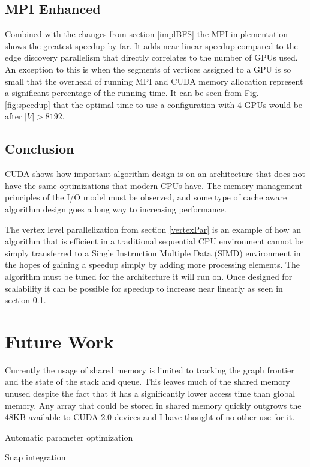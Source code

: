 \documentclass[10pt,twocolumn]{article}
\begin{document}
\subsection{MPI Enhanced}
\label{mpiResults}
Combined with the changes from section \ref{implBFS} the MPI implementation shows the greatest speedup by far. It adds near linear speedup compared to the edge discovery parallelism that directly correlates to the number of GPUs used. An exception to this is when the segments of vertices assigned to a GPU is so small that the overhead of running MPI and CUDA memory allocation represent a significant percentage of the running time. It can be seen from Fig. \ref{fig:speedup} that the optimal time to use a configuration with 4 GPUs would be after $|V| > 8192$.

\subsection{Conclusion}
CUDA shows how important algorithm design is on an architecture that does not have the same optimizations that modern CPUs have. The memory management principles of the I/O model must be observed, and some type of cache aware algorithm design goes a long way to increasing performance.

The vertex level parallelization from section \ref{vertexPar} is an example of how an algorithm that is efficient in a traditional sequential CPU environment cannot be simply transferred to a Single Instruction Multiple Data (SIMD) environment in the hopes of gaining a speedup simply by adding more processing elements. The algorithm must be tuned for the architecture it will run on. Once designed for scalability it can be possible for speedup to increase near linearly as seen in section \ref{mpiResults}.

\section{Future Work}
Currently the usage of shared memory is limited to tracking the graph frontier and the state of the stack and queue. This leaves much of the shared memory unused despite the fact that it has a significantly lower access time than global memory. Any array that could be stored in shared memory quickly outgrows the 48KB available to CUDA 2.0 devices and I have thought of no other use for it.

Automatic parameter optimization

Snap integration



\end{document}
